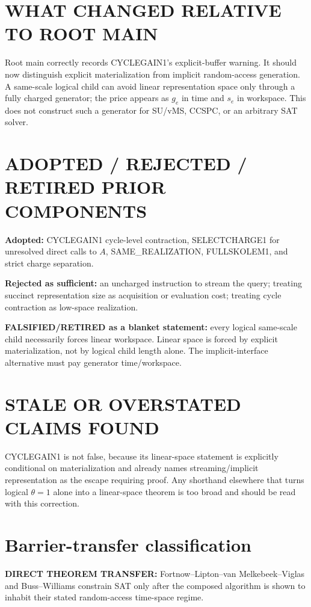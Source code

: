 \documentclass[11pt]{article}
\begin{document}
\section*{WHAT CHANGED RELATIVE TO ROOT MAIN}
Root main correctly records CYCLEGAIN1's explicit-buffer warning. It should now distinguish explicit materialization from implicit random-access generation. A same-scale logical child can avoid linear representation space only through a fully charged generator; the price appears as \(g_e\) in time and \(s_e\) in workspace. This does not construct such a generator for SU/vMS, CCSPC, or an arbitrary SAT solver.

\section*{ADOPTED / REJECTED / RETIRED PRIOR COMPONENTS}
\textbf{Adopted:} CYCLEGAIN1 cycle-level contraction, SELECTCHARGE1 for unresolved direct calls to \(A\), SAME\_REALIZATION, FULLSKOLEM1, and strict charge separation.

\textbf{Rejected as sufficient:} an uncharged instruction to stream the query; treating succinct representation size as acquisition or evaluation cost; treating cycle contraction as low-space realization.

\textbf{FALSIFIED/RETIRED as a blanket statement:} every logical same-scale child necessarily forces linear workspace. Linear space is forced by explicit materialization, not by logical child length alone. The implicit-interface alternative must pay generator time/workspace.

\section*{STALE OR OVERSTATED CLAIMS FOUND}
CYCLEGAIN1 is not false, because its linear-space statement is explicitly conditional on materialization and already names streaming/implicit representation as the escape requiring proof. Any shorthand elsewhere that turns logical \(\theta=1\) alone into a linear-space theorem is too broad and should be read with this correction.

\section*{Barrier-transfer classification}
\textbf{DIRECT THEOREM TRANSFER:} Fortnow--Lipton--van Melkebeek--Viglas and Buss--Williams constrain SAT only after the composed algorithm is shown to inhabit their stated random-access time-space regime.
\end{document}
